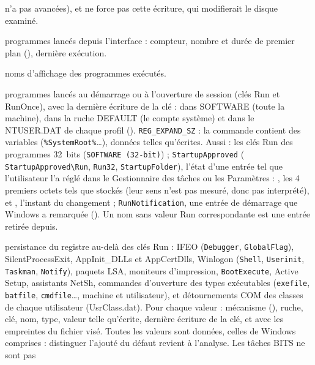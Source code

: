 \documentclass[11pt,a4paper,oneside]{report}
\begin{document}
\begin{description}[style=nextline,leftmargin=1.2em]
        n'a pas avancées), et \wac{} ne force pas cette écriture, qui
        modifierait le disque examiné.
  \item[\fichier{userassists.json}] programmes lancés depuis l'interface :
        compteur, nombre et durée de premier plan (),
        dernière exécution.
  \item[\fichier{muicache.json}] noms d'affichage des programmes exécutés.
  \item[\fichier{run.json}] programmes lancés au démarrage ou à l'ouverture de
        session (clés Run et RunOnce), avec la dernière écriture de la clé : dans
        SOFTWARE (toute la machine), dans la ruche DEFAULT (le compte système) et
        dans le NTUSER.DAT de chaque profil (). 
        \texttt{REG\_EXPAND\_SZ} : la commande contient des variables
        (\texttt{\%SystemRoot\%}\ldots), données telles qu'écrites. Aussi :
        les clés Run des programmes 32~bits (\texttt{SOFTWARE (32-bit)}) ;
        \texttt{StartupApproved} ( \texttt{StartupApproved\textbackslash Run},
        \texttt{Run32}, \texttt{StartupFolder}), l'état d'une entrée tel que
        l'utilisateur l'a réglé dans le Gestionnaire des tâches ou les Paramètres :
        , les 4 premiers octets tels que stockés (leur sens n'est pas
        mesuré, donc pas interprété), et , l'instant du
        changement ; \texttt{RunNotification}, une entrée de démarrage que Windows
        a remarquée (). Un nom sans valeur Run correspondante
        est une entrée retirée depuis.
  \item[\fichier{persistence.json}] persistance du registre au-delà des clés
        Run : IFEO (\texttt{Debugger}, \texttt{GlobalFlag}), SilentProcessExit,
        AppInit\_DLLs et AppCertDlls, Winlogon (\texttt{Shell},
        \texttt{Userinit}, \texttt{Taskman}, \texttt{Notify}), paquets LSA,
        moniteurs d'impression, \texttt{BootExecute}, Active Setup, assistants
        NetSh, commandes d'ouverture des types exécutables (\texttt{exefile},
        \texttt{batfile}, \texttt{cmdfile}\ldots, machine et utilisateur), et
        détournements COM des classes de chaque utilisateur (UsrClass.dat). Pour chaque valeur : mécanisme (),
        ruche, clé, nom, type, valeur telle qu'écrite, dernière écriture de la
        clé, et avec  les empreintes du fichier visé. Toutes les
        valeurs sont données, celles de Windows comprises : distinguer
        l'ajouté du défaut revient à l'analyse. Les tâches BITS ne sont pas

\end{description}
\end{document}
